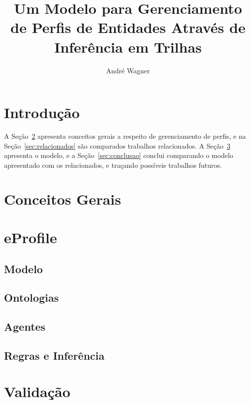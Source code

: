 \documentclass[a4paper,twocolumn]{article}
\author{André Wagner}
\title{Um Modelo para Gerenciamento de Perfis de Entidades Através de Inferência em Trilhas}
\date{}
\begin{document}
\maketitle

\section{Introdução}
\label{sec:introducao}


A Seção~\ref{sec:conceitos} apresenta conceitos gerais a respeito de gerenciamento de perfis, e na Seção~\ref{sec:relacionados} são comparados trabalhos relacionados. A Seção~\ref{sec:eprofile} apresenta o modelo, e a Seção~\ref{sec:conclusao} conclui comparando o modelo apresentado com os relacionados, e traçando possíveis trabalhos futuros.

\section{Conceitos Gerais}
\label{sec:conceitos}


\section{eProfile}
\label{sec:eprofile}


  \subsection{Modelo}
  \label{sec:modelo}
  

  \subsection{Ontologias}
  \label{sec:ontologias}
  

  \subsection{Agentes}
  \label{sec:agentes}
  

  \subsection{Regras e Inferência}
  \label{sec:inferencia}
  

\section{Validação}
\label{sec:validacao}


%



\begin{small}
  
\end{small}
\end{document}

